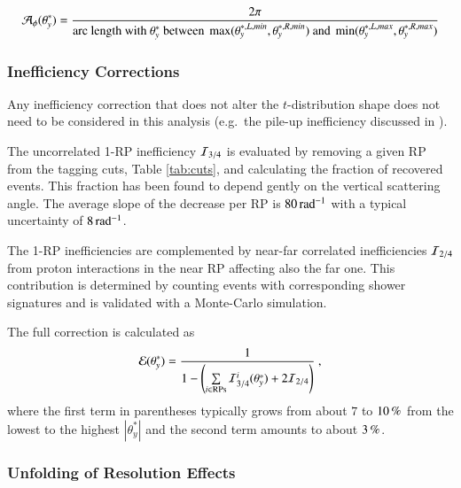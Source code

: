 \begin{equation}
\label{acceptance}
{\cal A_{\phi}}(\theta_y^*) = {
	2\pi\over 
	\hbox{arc length with $\theta_y^*$ between } \max(\theta_y^{*,L,min}, \theta_y^{*,R,min}) \hbox{ and } \min(\theta_y^{*,L,max}, \theta_y^{*,R,max})
}
\end{equation}
\fi


\subsubsection{Inefficiency Corrections}
\label{sec:ineff corr}

Any inefficiency correction that does not alter the $t$-distribution shape does not need to be considered in this analysis (e.g.~the pile-up inefficiency discussed in \cite{prl111}).

The uncorrelated 1-RP inefficiency ${\cal I}_{3/4}$ is evaluated by removing a given RP from the tagging cuts, Table \ref{tab:cuts}, and calculating the fraction of recovered events. This fraction has been found to depend gently on the vertical scattering angle. The average slope of the decrease per RP is $80\,{\rm rad^{-1}}$ with a typical uncertainty of $8\,{\rm rad^{-1}}$.

The 1-RP inefficiencies are complemented by near-far correlated inefficiencies ${\cal I}_{2/4}$ from proton interactions in the near RP affecting also the far one. This contribution is determined by counting events with corresponding shower signatures and is validated with a Monte-Carlo simulation.

The full correction is calculated as
\begin{equation}
\label{efficiency}
	{\cal E}(\theta_y^*) = {1\over 1 - \left( \sum\limits_{i\in \rm RPs} {\cal I}^i_{3/4}(\theta_y^*) + 2 {\cal I}_{2/4} \right) } \ ,
\end{equation}
where the first term in parentheses typically grows from about $7$ to $10\,{\rm \%}$ from the lowest to the highest $|\theta_y^*|$ and the second term amounts to about $3\,{\rm \%}$.




\subsubsection{Unfolding of Resolution Effects}
\label{sec:unfolding}

